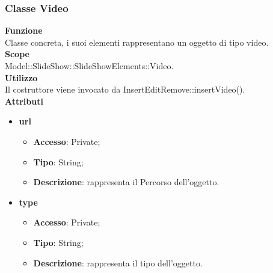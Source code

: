 {	\subsubsection{Classe Video}{
		\label{Video}
		\textbf{Funzione}\\
			\indent Classe concreta, i suoi elementi rappresentano un oggetto di tipo video.\\
	   	\textbf{Scope}\\
			\indent Model::SlideShow::SlideShowElements::Video.\\
		\textbf{Utilizzo}\\
			\indent Il costruttore viene invocato da InsertEditRemove::insertVideo().\\
		\textbf{Attributi}
		\begin{itemize}
			\item \textbf{url}
			\begin{itemize}
				\item \textbf{Accesso}: Private;
				\item \textbf{Tipo}: String;
				\item \textbf{Descrizione}: rappresenta il Percorso dell’oggetto.
			\end{itemize}
			\item \textbf{type}
			\begin{itemize}
				\item \textbf{Accesso}: Private;
				\item \textbf{Tipo}: String;
				\item \textbf{Descrizione}: rappresenta il tipo dell'oggetto.
			\end{itemize}
		\end{itemize}
		}

}
